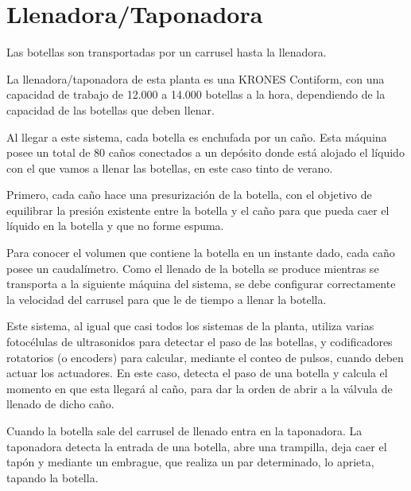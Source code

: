 \documentclass[11pt,a4paper,spanish,twoside]{report}
\begin{document}
\section{Llenadora/Taponadora}
Las botellas son transportadas por un carrusel hasta la llenadora.

La llenadora/taponadora de esta planta es una KRONES Contiform, con una 
capacidad de trabajo de 12.000 a 14.000 botellas a la hora, dependiendo de la 
capacidad de las botellas que deben llenar.

Al llegar a este sistema, cada botella es enchufada por un caño. Esta máquina 
posee un total de 80 caños conectados a un depósito donde está alojado el 
líquido con el que vamos a llenar las botellas, en este caso tinto de verano.

Primero, cada caño hace una presurización de la botella, con el objetivo de 
equilibrar la presión existente entre la botella y el caño para que pueda caer 
el líquido en la botella y que no forme espuma.

Para conocer el volumen que contiene la botella en un instante dado, cada caño 
posee un caudalímetro. Como el llenado de la botella se produce mientras se 
transporta a la siguiente máquina del sistema, se debe configurar correctamente
la velocidad del carrusel para que le de tiempo a llenar la botella.

Este sistema, al igual que casi todos los sistemas de la planta, utiliza varias
fotocélulas de ultrasonidos para detectar el paso de las botellas, y 
codificadores rotatorios (o encoders) para calcular, mediante el conteo de 
pulsos, cuando deben actuar los actuadores. En este caso, detecta el paso de 
una botella y calcula el momento en que esta llegará al caño, para dar la orden
de abrir a la válvula de llenado de dicho caño.

Cuando la botella sale del carrusel de llenado entra en la taponadora. La 
taponadora detecta la entrada de una botella, abre una trampilla, deja caer el 
tapón y mediante un embrague, que realiza un par determinado, lo aprieta, 
tapando la botella.
\end{document}
